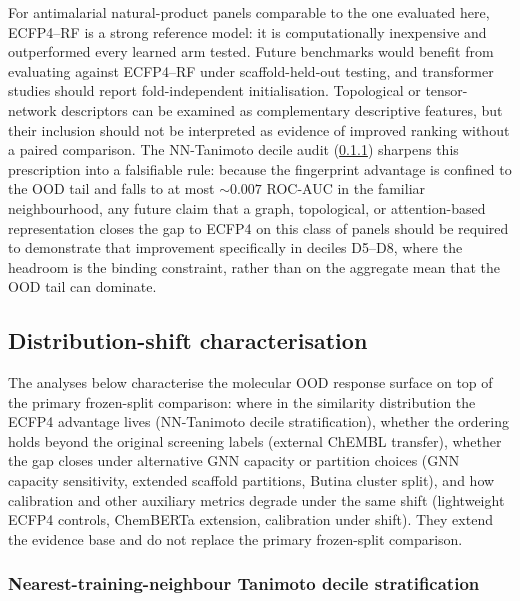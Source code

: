 \documentclass[11pt,a4paper]{article}
\begin{document}
For antimalarial natural-product panels comparable to the one evaluated here, ECFP4--RF is a strong reference model: it is computationally inexpensive and outperformed every learned arm tested. Future benchmarks would benefit from evaluating against ECFP4--RF under scaffold-held-out testing, and transformer studies should report fold-independent initialisation. Topological or tensor-network descriptors can be examined as complementary descriptive features, but their inclusion should not be interpreted as evidence of improved ranking without a paired comparison. The NN-Tanimoto decile audit (\cref{sec:nn-deciles-ref}) sharpens this prescription into a falsifiable rule: because the fingerprint advantage is confined to the OOD tail and falls to at most $\sim\num{0.007}$ ROC-AUC in the familiar neighbourhood, any future claim that a graph, topological, or attention-based representation closes the gap to ECFP4 on this class of panels should be required to demonstrate that improvement specifically in deciles D\num{5}--D\num{8}, where the headroom is the binding constraint, rather than on the aggregate mean that the OOD tail can dominate.

\subsection{Distribution-shift characterisation}

The analyses below characterise the molecular OOD response surface on top of the primary frozen-split comparison: where in the similarity distribution the ECFP4 advantage lives (NN-Tanimoto decile stratification), whether the ordering holds beyond the original screening labels (external ChEMBL transfer), whether the gap closes under alternative GNN capacity or partition choices (GNN capacity sensitivity, extended scaffold partitions, Butina cluster split), and how calibration and other auxiliary metrics degrade under the same shift (lightweight ECFP4 controls, ChemBERTa extension, calibration under shift). They extend the evidence base and do not replace the primary frozen-split comparison.

\subsubsection{Nearest-training-neighbour Tanimoto decile stratification}
\label{sec:nn-deciles-ref}
\end{document}
